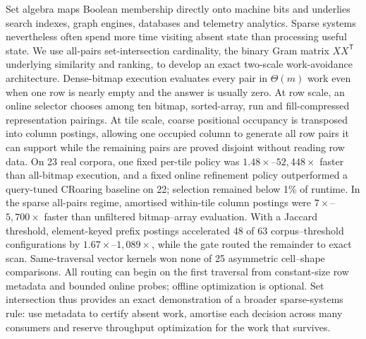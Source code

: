 Set algebra maps Boolean membership directly onto machine bits and underlies search indexes, graph
engines, databases and telemetry analytics. Sparse systems nevertheless often spend more time
visiting absent state than processing useful state. We use all-pairs set-intersection cardinality,
the binary Gram matrix $XX^{\mathsf T}$ underlying similarity and ranking, to develop an exact
two-scale work-avoidance architecture. Dense-bitmap execution evaluates every pair in $\Theta(m)$
work even when one row is nearly empty and the answer is usually zero. At row scale, an online selector chooses among ten
bitmap, sorted-array, run and fill-compressed representation pairings. At tile scale, coarse
positional occupancy is transposed into column postings, allowing one occupied column to generate
all row pairs it can support while the remaining pairs are proved disjoint without reading row data.
On 23 real corpora, one fixed per-tile policy was $1.48\times$--$52{,}448\times$ faster than
all-bitmap execution, and a fixed online refinement policy outperformed a query-tuned CRoaring
baseline on 22; selection remained below 1\% of runtime. In the sparse all-pairs regime, amortised
within-tile column postings were $7\times$--$5{,}700\times$ faster than unfiltered bitmap--array
evaluation. With a Jaccard threshold, element-keyed prefix postings accelerated 48 of 63
corpus--threshold configurations by $1.67\times$--$1{,}089\times$, while the gate routed the
remainder to exact scan. Same-traversal vector kernels won none of 25 asymmetric cell--shape comparisons.
All routing can begin on the first traversal from constant-size row metadata and bounded online
probes; offline optimization is optional. Set intersection thus provides an exact demonstration of
a broader sparse-systems rule: use metadata to certify absent work, amortise each decision across
many consumers and reserve throughput optimization for the work that survives.
